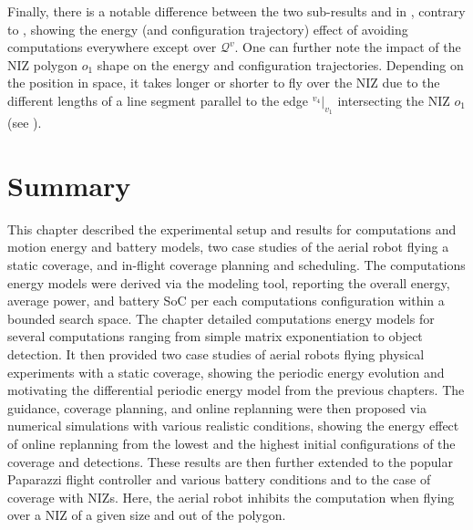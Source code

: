 Finally, there is a notable difference between the two sub-results  and  in , contrary to , showing the energy (and configuration trajectory) effect of avoiding computations everywhere except over $\mathcal{Q}^v$. One can further note the impact of the NIZ polygon $o_1$ shape on the energy and configuration trajectories. Depending on the position in space, it takes longer or shorter to fly over the NIZ due to the different lengths of a line segment parallel to the edge ${}^{v_4}|_{v_1}$ intersecting the NIZ $o_1$ (see ).


\section{Summary}

This chapter described the experimental setup and results for computations and motion energy and battery models, two case studies of the aerial robot flying a static coverage, and in-flight coverage planning and scheduling. The computations energy models were derived via the \powprof{} modeling tool, reporting the overall energy, average power, and battery SoC per each computations configuration within a bounded search space. The chapter detailed computations energy models for several computations ranging from simple matrix exponentiation to object detection. It then provided two case studies of aerial robots flying physical experiments with a static coverage, showing the periodic energy evolution and motivating the differential periodic energy model from the previous chapters. The guidance, coverage planning, and online replanning were then proposed via numerical simulations with various realistic conditions, showing the energy effect of online replanning from the lowest and the highest initial configurations of the coverage and detections. These results are then further extended to the popular Paparazzi flight controller and various battery conditions and to the case of coverage with NIZs. Here, the aerial robot inhibits the computation when flying over a NIZ of a given size and out of the polygon.

